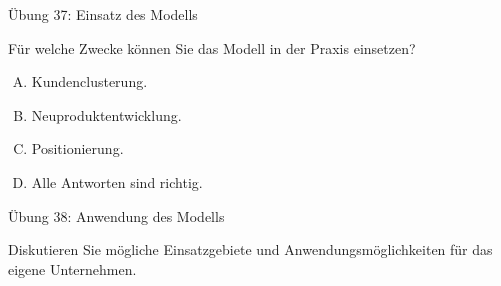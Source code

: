 \documentclass[12pt,ngerman,a4paper,ignorenonframetext,]{beamer}
\providecommand{\tightlist}{%
  \setlength{\itemsep}{0pt}\setlength{\parskip}{0pt}}
\begin{document}
\begin{frame}{Übung 37: Einsatz des Modells}
\protect\hypertarget{ubung-37-einsatz-des-modells}{}

Für welche Zwecke können Sie das Modell in der Praxis einsetzen?

\begin{enumerate}
[A.]
\tightlist
\item
  Kundenclusterung.
\item
  Neuproduktentwicklung.
\item
  Positionierung.
\item
  Alle Antworten sind richtig.
\end{enumerate}


\end{frame}

\begin{frame}{Übung 38: Anwendung des Modells}
\protect\hypertarget{ubung-38-anwendung-des-modells}{}

Diskutieren Sie mögliche Einsatzgebiete und Anwendungsmöglichkeiten für
das eigene Unternehmen.


\end{frame}
\end{document}
